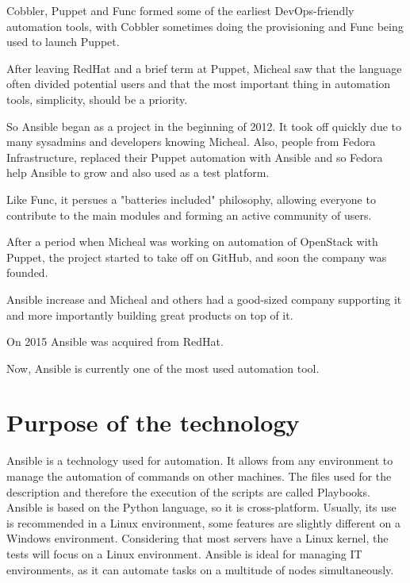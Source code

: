\documentclass[12pt,a4paper,openright,twoside]{book}
\begin{document}
Cobbler, Puppet and Func formed some of the earliest DevOps-friendly automation tools, with Cobbler sometimes doing the provisioning and Func being used to launch Puppet.

After leaving RedHat and a brief term at Puppet, Micheal saw that the language often divided potential users and that the most important thing in automation tools, simplicity, should be a priority.

So Ansible began as a project in the beginning of 2012. It took off quickly due to many sysadmins and developers knowing Micheal.
Also, people from Fedora Infrastructure, replaced their Puppet automation with Ansible and so Fedora help Ansible to grow and also used as a test platform.

Like Func, it persues a "batteries included" philosophy, allowing everyone to contribute to the main modules and forming an active community of users.

After a period when Micheal was working on automation of OpenStack with Puppet, the project started to take off on GitHub, and soon the company was founded.

Ansible increase and Micheal and others had a good-sized company supporting it and more importantly building great products on top of it.

On 2015 Ansible was acquired from RedHat\cite{ansibleRedHat}.

Now, Ansible is currently one of the most used automation tool.

\section{Purpose of the technology}
Ansible is a technology used for automation. It allows from any environment to manage the automation of commands on other machines.
The files used for the description and therefore the execution of the scripts are called Playbooks.
Ansible is based on the Python language, so it is cross-platform.
Usually, its use is recommended in a Linux environment, some features are slightly different on a Windows environment.
Considering that most servers have a Linux kernel, the tests will focus on a Linux environment.
Ansible is ideal for managing IT environments, as it can automate tasks on a multitude of nodes simultaneously.
\end{document}
